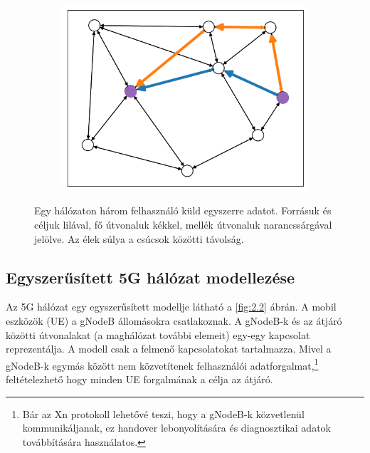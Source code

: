 \documentclass[a4paper,oneside]{article}
\begin{document}
\begin{figure}[h]
\begin{subfigure}[t]{0.33\textwidth}
    \includegraphics[width=\textwidth]{user2_with_protection.png}
  \end{subfigure}
  \caption{
    Egy hálózaton három felhasználó küld egyszerre adatot.
    Forrásuk és céljuk lilával, fő útvonaluk kékkel, mellék útvonaluk narancssárgával jelölve.
    Az élek súlya a csúcsok közötti távolság.
  } \label{fig:2.1}
\end{figure}

\subsection{Egyszerűsített 5G hálózat modellezése}
\label{sec:5gnetwork}

Az 5G hálózat egy egyszerűsített modellje látható a \ref{fig:2.2} ábrán.
A mobil eszközök (UE) a gNodeB állomásokra csatlakoznak.
A gNodeB-k és az átjáró közötti útvonalakat (a maghálózat további elemeit) egy-egy kapcsolat reprezentálja.
A modell csak a felmenő kapcsolatokat tartalmazza.
Mivel a gNodeB-k egymás között nem közvetítenek felhasználói adatforgalmat,\footnote{
  Bár az Xn protokoll lehetővé teszi, hogy a gNodeB-k közvetlenül kommunikáljanak, ez handover lebonyolítására és diagnosztikai adatok továbbítására használatos.
}
feltételezhető hogy minden UE forgalmának a célja az átjáró.
\end{document}
